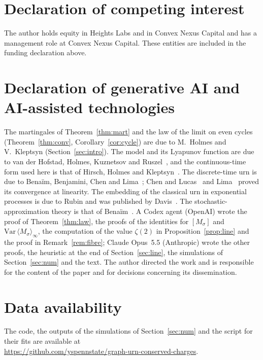 \documentclass[11pt]{amsart}
\theoremstyle{remark}\newtheorem{remark}[theorem]{Remark}
\begin{document}
\section*{Declaration of competing interest}
The author holds equity in Heights Labs and in Convex Nexus Capital and has a management role at Convex Nexus Capital.
These entities are included in the funding declaration above.

\section*{Declaration of generative AI and AI-assisted technologies}
The martingales of Theorem~\ref{thm:mart} and the law
of the limit on even cycles (Theorem~\ref{thm:conv}, Corollary~\ref{cor:cycle}) are due to M.~Holmes and
V.~Kleptsyn (Section~\ref{sec:intro}). The model and its Lyapunov function are due
to van der Hofstad, Holmes, Kuznetsov and Ruszel~\cite{HHKR}, and the continuous-time form used here is that
of Hirsch, Holmes and Kleptsyn~\cite{HHKtree}. The discrete-time urn is due to Bena\"im, Benjamini, Chen and
Lima~\cite{BBCL}; Chen and Lucas~\cite{CL} and Lima~\cite{Lima} proved its convergence at linearity. The embedding of
the classical urn in exponential processes is due to Rubin and was published by Davis~\cite{Davis}. The
stochastic-approximation theory is that of Bena\"im~\cite{Ben99}. A Codex agent (OpenAI) wrote the proof of
Theorem~\ref{thm:law}, the proofs of the identities for $[M_\sigma]$ and $\mathrm{Var}\,\langle M_\sigma\rangle_\infty$, the
computation of the value $\zeta(2)$ in Proposition~\ref{prop:line} and the proof in Remark~\ref{rem:fibre}; Claude Opus~5.5
(Anthropic) wrote the other proofs, the heuristic at the end of Section~\ref{sec:line}, the
simulations of Section~\ref{sec:num} and the text. The author directed the work and is responsible for the content of
the paper and for decisions concerning its dissemination.

\section*{Data availability}
The code, the outputs of the simulations of Section~\ref{sec:num} and the script for their fits are available at\\ \url{https://github.com/yspennstate/graph-urn-conserved-charges}.
\clearpage
\appendix
\end{document}
